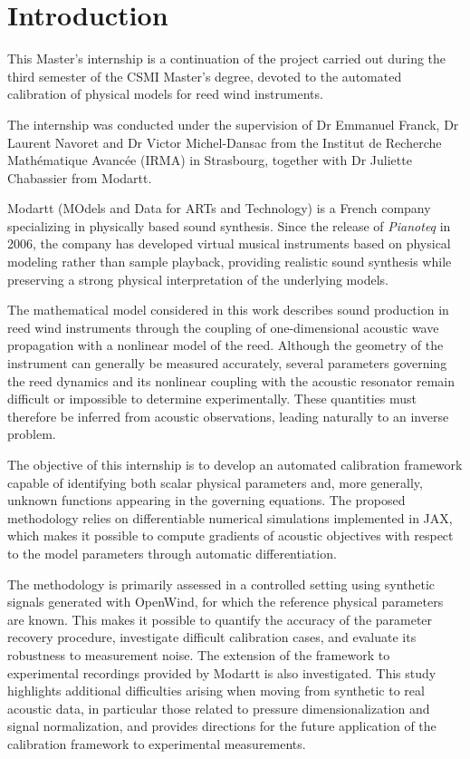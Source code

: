 \documentclass[11pt,a4paper]{report}
\theoremstyle{plain}
\theoremstyle{definition}
\begin{document}
\newpage
\setcounter{tocdepth}{2}
\clearpage
\thispagestyle{plain}
\tableofcontents


\newpage

\chapter*{Introduction}
\mtcaddchapter
{}

This Master's internship is a continuation of the project carried out during
the third semester of the CSMI Master's degree, devoted to the automated
calibration of physical models for reed wind instruments.

The internship was conducted under the supervision of Dr Emmanuel Franck,
Dr Laurent Navoret and Dr Victor Michel-Dansac from the Institut de Recherche
Mathématique Avancée (IRMA) in Strasbourg, together with Dr Juliette Chabassier
from Modartt.

Modartt (MOdels and Data for ARTs and Technology) \cite{Modartt} is a French
company specializing in physically based sound synthesis. Since the release of
\textit{Pianoteq} in 2006, the company has developed virtual musical instruments
based on physical modeling rather than sample playback, providing realistic
sound synthesis while preserving a strong physical interpretation of the
underlying models.

The mathematical model considered in this work describes sound production in
reed wind instruments through the coupling of one-dimensional acoustic wave
propagation with a nonlinear model of the reed. Although the geometry of the
instrument can generally be measured accurately, several parameters governing
the reed dynamics and its nonlinear coupling with the acoustic resonator remain
difficult or impossible to determine experimentally. These quantities must
therefore be inferred from acoustic observations, leading naturally to an
inverse problem.

The objective of this internship is to develop an automated calibration
framework capable of identifying both scalar physical parameters and, more
generally, unknown functions appearing in the governing equations. The proposed
methodology relies on differentiable numerical simulations implemented in JAX,
which makes it possible to compute gradients of acoustic objectives with
respect to the model parameters through automatic differentiation.

The methodology is primarily assessed in a controlled setting using synthetic
signals generated with OpenWind, for which the reference physical parameters
are known. This makes it possible to quantify the accuracy of the parameter
recovery procedure, investigate difficult calibration cases, and evaluate its
robustness to measurement noise. The extension of the framework to experimental
recordings provided by Modartt is also investigated. This study highlights
additional difficulties arising when moving from synthetic to real acoustic
data, in particular those related to pressure dimensionalization and signal
normalization, and provides directions for the future application of the
calibration framework to experimental measurements.
\end{document}
